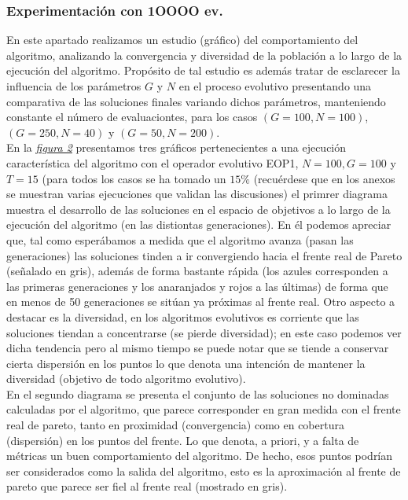 \justify
\subsubsection{Experimentación con 1OOOO ev.}

En este apartado realizamos un estudio (gráfico) del comportamiento del algoritmo, analizando la convergencia y diversidad de la población a lo largo de la ejecución del algoritmo. Propósito de tal estudio es además tratar de esclarecer la influencia de los parámetros $G$ y $N$ en el proceso evolutivo presentando una comparativa de las soluciones finales variando dichos parámetros, manteniendo constante el número de evaluaciontes, para los casos $(G=100, N=100)$, $(G=250, N=40)$ y $(G=50, N=200)$.\\

En la \hyperref[fig:2]{\textit{figura 2}} presentamos tres gráficos pertenecientes a una ejecución característica del algoritmo con el operador evolutivo EOP1, $N=100, G=100$ y $T=15$ (para todos los casos se ha tomado un $15\%$  (recuérdese que en los anexos se muestran varias ejecuciones que validan las discusiones) el primrer diagrama muestra el desarrollo de las soluciones en el espacio de objetivos a lo largo de la ejecución del algoritmo (en las distiontas generaciones). En él podemos apreciar que, tal como esperábamos a medida que el algoritmo avanza (pasan las generaciones) las soluciones tinden a ir convergiendo hacia el frente real de Pareto (señalado en gris), además de forma bastante rápida (los azules corresponden a las primeras generaciones y los anaranjados y rojos a las últimas) de forma que en menos de 50 generaciones se sitúan ya próximas al frente real. Otro aspecto a destacar es la diversidad, en los algoritmos evolutivos es corriente que las soluciones tiendan a concentrarse (se pierde diversidad); en este caso podemos ver dicha tendencia pero al mismo tiempo se puede notar que se tiende a conservar cierta dispersión en los puntos lo que denota una intención de mantener la diversidad (objetivo de todo algoritmo evolutivo).\\

En el segundo diagrama se presenta el conjunto de las soluciones no dominadas calculadas por el algoritmo, que parece corresponder en gran medida con el frente real de pareto, tanto en proximidad (convergencia) como en cobertura (dispersión) en los puntos del frente. Lo que denota, a priori, y a falta de métricas un buen comportamiento del algoritmo. De hecho, esos puntos podrían ser considerados como la salida del algoritmo, esto es la aproximación al frente de pareto que parece ser fiel al frente real (mostrado en gris).\\

